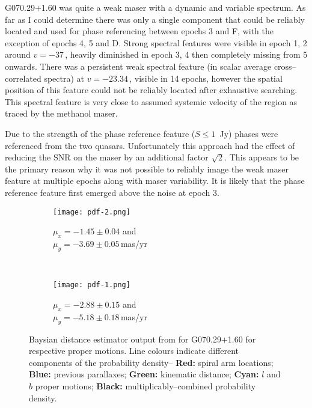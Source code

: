             G070.29$+$1.60 was quite a weak maser with a dynamic and variable spectrum. As far as I could determine there was only a single component that could be reliably located and used for phase referencing between epochs 3 and F, with the exception of epochs 4, 5 and D. Strong spectral features were visible in epoch 1, 2 around $v=-37$\,\kms, heavily diminished in epoch 3, 4 then completely missing from 5 onwards. There was a persistent weak spectral feature (in scalar average cross--correlated spectra) at $v=-23.34$\,\kms, visible in 14 epochs, however the spatial position of this feature could not be reliably located after exhaustive searching. This spectral feature is very close to assumed systemic velocity of the region as traced by the methanol maser.
            
            Due to the strength of the phase reference feature ($S\le1$~Jy) phases were referenced from the two quasars. Unfortunately this approach had the effect of reducing the SNR on the maser by an additional factor $\sqrt{2}$. This appears to be the primary reason why it was not possible to reliably image the weak maser feature at multiple epochs along with maser variability. It is likely that the phase reference feature first emerged above the noise at epoch 3. 
            
	        \begin{figure}[H]
	        	\centering
	        	\begin{subfigure}[t]{0.45\textwidth}
	        		\centering
	        		\texttt{[image: pdf-2.png]}
	        		\caption[Measured proper motions bayesian]{$\mu_x=-1.45\pm0.04$ and\\ $\mu_y=-3.69\pm0.05$\,mas/yr}
	        	\end{subfigure}
	        	~
	        	\begin{subfigure}[t]{0.45\textwidth}
	        		\centering
	        		\texttt{[image: pdf-1.png]}
	        		\caption[G070.18$+$1.74 proper motions bayesian]{$\mu_x=-2.88\pm0.15$ and\\ $\mu_y=-5.18\pm0.18$\,mas/yr}
	        	\end{subfigure}
	        	\caption[G070 region baysian distance estimator]{Baysian distance estimator output from \citet{Reid2019} for G070.29$+$1.60 for respective proper motions. Line colours indicate different components of the probability density-- \textbf{Red:} spiral arm locations; \textbf{Blue:} previous parallaxes; \textbf{Green:} kinematic distance; \textbf{Cyan:} $l$ and $b$ proper motions; \textbf{Black:} multiplicably--combined probability density.}\label{fig:g070_bayes}%
	        \end{figure}
            
